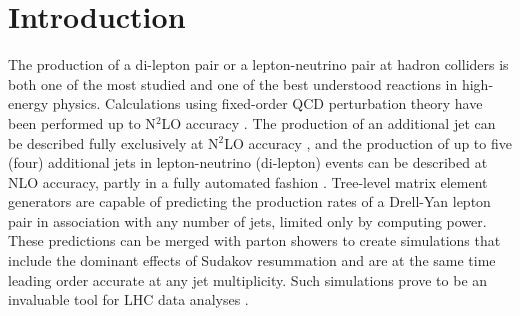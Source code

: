\documentclass[aps,prd,twocolumn,fleqn,superscriptaddress,groupedaddress,nofootinbib,preprintnumbers]{revtex4}
\begin{document}
\section{Introduction}
The production of a di-lepton pair or a lepton-neutrino pair
at hadron colliders \cite{Drell:1970wh,Drell:1970yt} is both one of the most studied
and one of the best understood reactions in high-energy physics.
Calculations using fixed-order QCD perturbation theory have been performed
up to N$^2$LO accuracy \cite{Altarelli:1978id,%
  Altarelli:1979ub,%
  Hamberg:1990np,vanNeerven:1991gh}.
The production of an additional jet can be described fully exclusively at N$^2$LO accuracy
\cite{Ridder:2015dxa,Boughezal:2015ded,Boughezal:2016dtm,Ridder:2016nkl,Gehrmann-DeRidder:2017mvr},
and the production of up to five (four) additional jets in lepton-neutrino
(di-lepton) events can be described \cite{Giele:1993dj,Campbell:2002tg,Campbell:2003hd} at NLO accuracy,
partly in a fully automated fashion \cite{Ellis:2009zw,Berger:2009zg,Berger:2010vm,
  Berger:2010zx,Ita:2011wn,Bern:2013gka}.
Tree-level matrix element generators
\cite{Kanaki:2000ey,Papadopoulos:2000tt,Krauss:2001iv,Mangano:2002ea,
  Gleisberg:2008fv,Alwall:2011uj,Alwall:2014hca}
are capable of predicting the production rates of a Drell-Yan lepton pair
in association with any number of jets, limited only by computing power.
These predictions can be merged with parton showers \cite{
  Andre:1997vh,Mangano:2001xp,Catani:2001cc,Lonnblad:2001iq,
  Hamilton:2009ne,Hoeche:2010kg,Lonnblad:2012ng,Platzer:2012bs}
to create simulations that include the dominant effects of Sudakov resummation
and are at the same time leading order accurate at any jet multiplicity.
Such simulations prove to be an invaluable tool for LHC data analyses \cite{Buckley:2011ms}.
\end{document}
